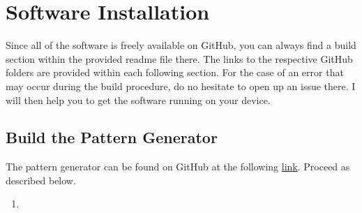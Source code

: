 \chapter{Software Installation}
\label{sec::A_si}
Since all of the software is freely available on GitHub, you can always find a build section within the provided readme file there. The links to the respective GitHub folders are provided within each following section. For the case of an error that may occur during the build procedure, do no hesitate to open up an issue there. I will then help you to get the software running on your device.
\section{Build the Pattern Generator}
\label{sec::A1_pg}
The pattern generator can be found on GitHub at the following \href{https://github.com/mhubii/nmpc_pattern_generator}{link}. Proceed as described below.
\begin{enumerate}
	\item 
\end{enumerate}
